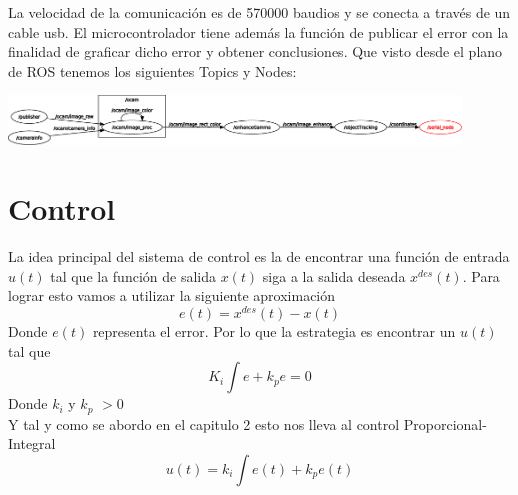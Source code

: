 La velocidad de la comunicación es de 570000 baudios y se conecta a través de un cable usb. El microcontrolador tiene además
la función de publicar el error con la finalidad de graficar dicho error y obtener conclusiones. Que visto desde el plano
de ROS tenemos los siguientes Topics y Nodes:
\begin{center}
	\includegraphics[width=0.9\textwidth]{Contenido/Cuerpo/Capitulo5/Fig3.eps}
	\label{Fig4}
\end{center}




\section{Control}
La idea principal del sistema de control es la de encontrar una función de entrada $u(t)$ tal que la función de salida $x(t)$ siga a la
salida deseada $x^{des}(t)$. Para lograr esto vamos a utilizar la siguiente aproximación
\begin{equation}
	e(t) = x^{des}(t) - x(t)
\end{equation}
Donde $e(t)$ representa el error. Por lo que la estrategia es encontrar un $u(t)$ tal que
\begin{equation}
	K_i\int e + k_pe = 0
\end{equation}
Donde $k_i$ y $k_p$ $> 0$\\
Y tal y como se abordo en el capitulo 2 esto nos lleva al control Proporcional-Integral
\begin{equation}
	u(t) = k_i\int{e}(t) + k_pe(t)
\end{equation}

